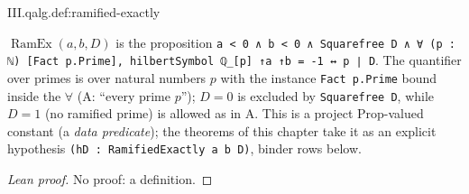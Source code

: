 \begin{definition}
\end{definition}
\begin{tfformal}{III.qalg.def:ramified-exactly}
\begin{tffidelity}
$\operatorname{RamEx}(a,b,D)$ is the proposition \texttt{a < 0 ∧ b < 0 ∧ Squarefree D ∧ ∀ (p : ℕ) [Fact p.Prime], hilbertSymbol ℚ\_[p] ↑a ↑b = -1 ↔ p ∣ D}. The quantifier over primes is over natural numbers $p$ with the instance \texttt{Fact p.Prime} bound inside the $\forall$ (A: ``every prime $p$''); $D=0$ is excluded by \texttt{Squarefree D}, while $D=1$ (no ramified prime) is allowed as in A. This is a project Prop-valued constant (a \emph{data predicate}); the theorems of this chapter take it as an explicit hypothesis \texttt{(hD : RamifiedExactly a b D)}, binder rows below.
\end{tffidelity}
\end{tfformal}
\begin{proof}[Lean proof]
No proof: a definition.
\end{proof}


